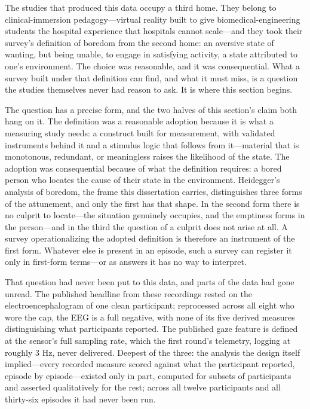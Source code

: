 The studies that produced this data occupy a third home. They belong to clinical-immersion
pedagogy---virtual reality built to give biomedical-engineering students the hospital
experience that hospitals cannot scale---and they took their survey's definition of boredom
from the second home: an aversive state of wanting, but being unable, to engage in
satisfying activity, a state attributed to one's environment. The choice was reasonable, and
it was consequential. What a survey built under that definition can find, and what it must
miss, is a question the studies themselves never had reason to ask. It is where this section
begins.

The question has a precise form, and the two halves of this section's claim both hang on it.
The definition was a reasonable adoption because it is what a measuring study needs: a
construct built for measurement, with validated instruments behind it and a stimulus logic
that follows from it---material that is monotonous, redundant, or meaningless raises the
likelihood of the state. The adoption was consequential because of what the definition
requires: a bored person who locates the cause of their state in the environment. Heidegger's
analysis of boredom, the frame this dissertation carries, distinguishes three forms of the
attunement, and only the first has that shape. In the second form there is no culprit to
locate---the situation genuinely occupies, and the emptiness forms in the person---and in the
third the question of a culprit does not arise at all. A survey operationalizing the adopted
definition is therefore an instrument of the first form. Whatever else is present in an
episode, such a survey can register it only in first-form terms---or as answers it has no way
to interpret.

That question had never been put to this data, and parts of the data had gone unread. The
published headline from these recordings rested on the electroencephalogram of one clean
participant; reprocessed across all eight who wore the cap, the EEG is a full negative, with
none of its five derived measures distinguishing what participants reported. The published
gaze feature is defined at the sensor's full sampling rate, which the first round's telemetry,
logging at roughly 3 Hz, never delivered. Deepest of the three: the analysis the design itself
implied---every recorded measure scored against what the participant reported, episode by
episode---existed only in part, computed for subsets of participants and asserted
qualitatively for the rest; across all twelve participants and all thirty-six episodes it had
never been run.

